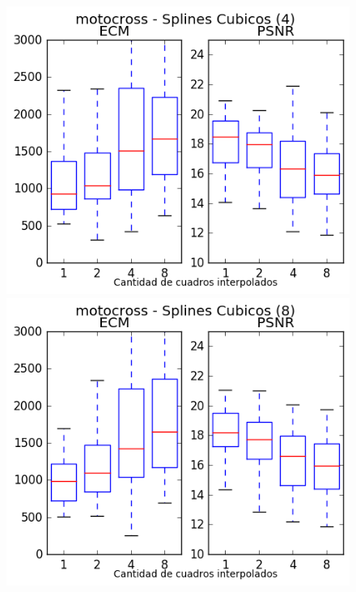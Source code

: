 \begin{figure}[H]
\centering
\begin{minipage}{0.33\textwidth}   
    \includegraphics[width=1\textwidth]{imgs/resultados_error/motocross_2.png} 
\end{minipage}\hfill
\begin{minipage}{0.33\textwidth}   
    \includegraphics[width=1\textwidth]{imgs/resultados_error/motocross_3.png} 
\end{minipage}\hfill
\begin{minipage}{0.33\textwidth}   

\end{minipage}
\end{figure}
